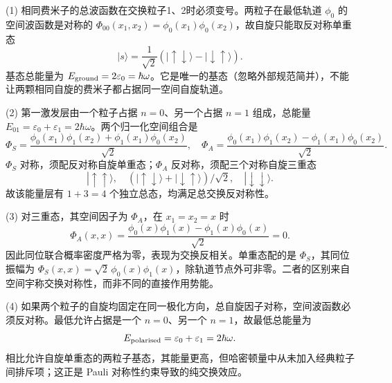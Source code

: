 (1) 相同费米子的总波函数在交换粒子1、2时必须变号。两粒子在最低轨道 \(\phi_0\) 的空间波函数是对称的 \(\Phi_{00}(x_1,x_2)=\phi_0(x_1)\phi_0(x_2)\)，故自旋只能取反对称单重态
\[
|s\rangle=\frac1{\sqrt2}(|\uparrow\downarrow\rangle-|\downarrow\uparrow\rangle).
\]
基态总能量为 \(E_{\rm ground}=2\varepsilon_0=\hbar\omega\)。它是唯一的基态（忽略外部规范简并），不能让两颗相同自旋的费米子都占据同一空间自旋轨道。

(2) 第一激发层由一个粒子占据 \(n=0\)、另一个占据 \(n=1\) 组成，总能量 \(E_{01}=\varepsilon_0+\varepsilon_1=2\hbar\omega\)。两个归一化空间组合是
\[
\Phi_S=\frac{\phi_0(x_1)\phi_1(x_2)+\phi_1(x_1)\phi_0(x_2)}{\sqrt2},
\quad
\Phi_A=\frac{\phi_0(x_1)\phi_1(x_2)-\phi_1(x_1)\phi_0(x_2)}{\sqrt2}.
\]
\(\Phi_S\) 对称，须配反对称自旋单重态；\(\Phi_A\) 反对称，须配三个对称自旋三重态
\[
|\uparrow\uparrow\rangle,\quad
(|\uparrow\downarrow\rangle+|\downarrow\uparrow\rangle)/\sqrt2,\quad
|\downarrow\downarrow\rangle.
\]
故该能量层有 \(1+3=4\) 个独立总态，均满足总交换反对称性。

(3) 对三重态，其空间因子为 \(\Phi_A\)，在 \(x_1=x_2=x\) 时
\[
\Phi_A(x,x)=\frac{\phi_0(x)\phi_1(x)-\phi_1(x)\phi_0(x)}{\sqrt2}=0.
\]
因此同位联合概率密度严格为零，表现为交换反相关。单重态配的是 \(\Phi_S\)，其同位振幅为 \(\Phi_S(x,x)=\sqrt2\,\phi_0(x)\phi_1(x)\)，除轨道节点外可非零。二者的区别来自空间宇称交换对称性，而非不同的直接作用势能。

(4) 如果两个粒子的自旋均固定在同一极化方向，总自旋因子对称，空间波函数必须反对称。最低允许占据是一个 \(n=0\)、另一个 \(n=1\)，故最低总能量为
\[
E_{\rm polarised}=\varepsilon_0+\varepsilon_1=2\hbar\omega.
\]
相比允许自旋单重态的两粒子基态，其能量更高，但哈密顿量中从未加入经典粒子间排斥项；这正是 Pauli 对称性约束导致的纯交换效应。
